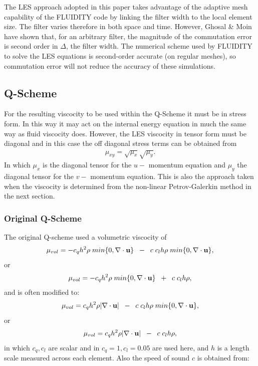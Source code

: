 The LES approach adopted in this paper takes advantage of the
adaptive mesh capability of the FLUIDITY code by linking the
filter width to the local element size. The filter varies
therefore in both space and time. However, Ghosal \& Moin
\cite{GnM95} have shown that, for an arbitrary filter, the
magnitude of the commutation error is second order in $\Delta$,
the filter width. The numerical scheme used by FLUIDITY to solve
the LES equations is second-order accurate (on regular meshes), so
commutation error will not reduce the accuracy of these
simulations.


\subsection{Q-Scheme}
For the resulting viscocity to be used within the
Q-Scheme it must be in stress form. In this way it
may act on the internal energy equation in much the same way
as fluid viscocity does. However, the LES viscocity in tensor
form must be diagonal and in this case the off diagonal
stress terms can be obtained from
\begin{eqnarray}
\mu_{xy}=\sqrt{\mu_x}\sqrt{\mu_y}.
\end{eqnarray}
In which $\mu_x$ is the diagonal tensor for the $u-$ momentum equation
and  $\mu_y$ the diagonal tensor for the $v-$ momentum equation.
This is also the approach taken when the viscocity is determined
from the non-linear Petrov-Galerkin method in the next section.

\subsubsection{Original Q-Scheme}
The original Q-scheme used a volumetric viscocity of
\begin{eqnarray}
\mu_{vol}=- c_q h^2 \rho \; min\{0, \nabla\cdot {\bf u}\} \;\; - \;\;c \;c_l  h \rho \; min\{0, \nabla\cdot {\bf u}\},
\label{original-q}
\end{eqnarray}
or
\begin{eqnarray}
\mu_{vol}=- c_q h^2 \rho \; min\{0, \nabla\cdot {\bf u}\} \;\; + \;\;c \;c_l  h \rho,
\label{original-q-b}
\end{eqnarray}
and is often modified to:
\begin{eqnarray}
\mu_{vol}= c_q h^2 \rho \vert \nabla\cdot {\bf u}\vert \;\;-\;\; c\; c_l  h \rho \; min\{0, \nabla\cdot {\bf u}\},
\label{original-q2}
\end{eqnarray}
or
\begin{eqnarray}
\mu_{vol}= c_q h^2 \rho \vert \nabla\cdot {\bf u}\vert \;\;-\;\; c\; c_l  h \rho,
\label{original-q2-b}
\end{eqnarray}
in which $c_q, c_l$ are scalar and in $c_q=1, c_l=0.05$ are used here,
and $h$ is a length scale measured across each element.
Also the speed of sound $c$ is obtained from:

